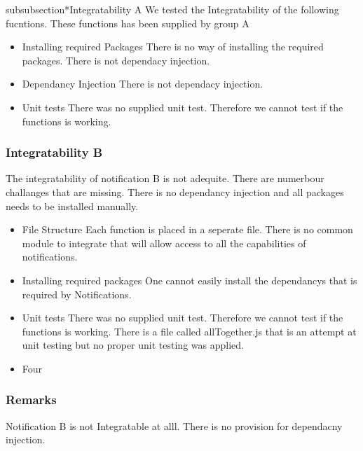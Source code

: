 subsubsection*{Integratability A}
We tested the Integratability of the following fucntions. These functions has been supplied by group A
\begin{itemize}
	\item Installing required Packages
	There is no way of installing the required packages.
	There is not dependacy injection.
	\item Dependancy Injection
	There is not dependacy injection.
	\item Unit tests
	There was no supplied unit test. Therefore we cannot test if the functions is working.
\end{itemize}
\subsubsection*{Integratability B}
The integratability of notification B is not adequite. There are numerbour challanges that are missing. There is no dependancy injection and all packages needs to be installed manually.
\begin{itemize}
	\item File Structure 
	Each function is placed in a seperate file. There is no common module to integrate that will allow access to all the capabilities of notifications.
	\item Installing required packages
	One cannot easily install the dependancys that is required by Notifications.
	\item Unit tests
	There was no supplied unit test. Therefore we cannot test if the functions is working. There is a file called allTogether.js that is an attempt at unit testing but no proper unit testing was applied.
	\item Four 
\end{itemize}
\subsubsection*{Remarks}
Notification B is not Integratable at alll. There is no provision for dependacny injection.
